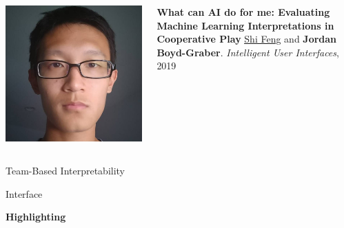 \documentclass[xcolor=dvipsnames,xcolor=table]{beamer}
\newcommand{\fsi}[2]{
\begin{frame}[plain]
\vspace*{-1pt}
\makebox[\linewidth]{\texttt{[image: \#1]}}
\begin{center}
#2
\end{center}
\end{frame}
}
\newcommand{\gfxq}[2]{
\begin{center}
	\texttt{[image: qb/\#1]}
\end{center}
}
\begin{document}
\begin{frame}{}

  \begin{columns}
    \begin{center}
        \includegraphics[width=0.8\linewidth]{general_figures/shi}
        \end{center}
        \begin{block}{{\bf What can AI do for me: Evaluating Machine Learning Interpretations in Cooperative Play}} \underline{\href{http://users.umiacs.umd.edu/~shifeng/}{Shi Feng}} and {\bf Jordan Boyd-Graber}. \emph{Intelligent User Interfaces}, 2019
        \end{block}

  \end{columns}
\end{frame}



\begin{frame}{Team-Based Interpretability}

  \only<1>{\gfxq{qb_centaur_1}{.9}}
  \only<2>{\gfxq{qb_centaur_2}{.9}}
  \only<3>{\gfxq{qb_centaur_3}{.9}}
  \only<4>{\gfxq{qb_centaur_6}{.9}}

\end{frame}


\fsi{qb/augment/screenshot_all}{Interface}

\fsi{qb/augment/screenshot_guesses}{}

\fsi{qb/augment/screenshot_highlight}{{\bf Highlighting}}
\end{document}
